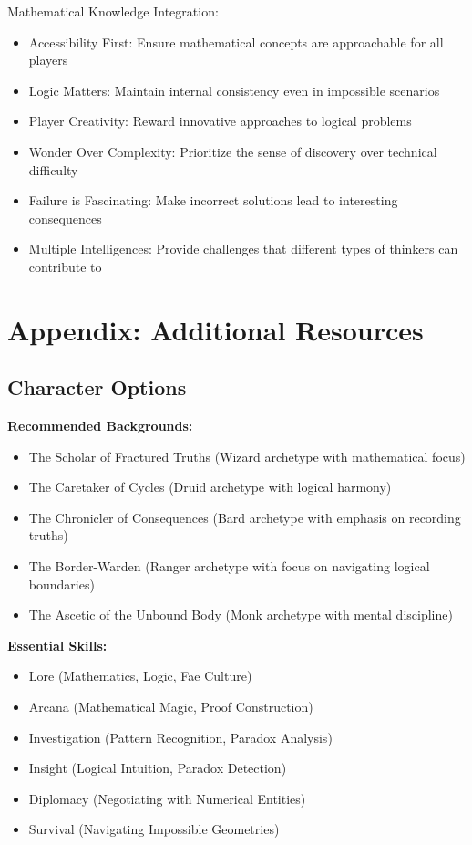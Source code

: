 \documentclass[11pt]{article}
\begin{document}
Mathematical Knowledge Integration:
\begin{itemize}
\item Accessibility First: Ensure mathematical concepts are approachable for all players
\item Logic Matters: Maintain internal consistency even in impossible scenarios
\item Player Creativity: Reward innovative approaches to logical problems
\item Wonder Over Complexity: Prioritize the sense of discovery over technical difficulty
\item Failure is Fascinating: Make incorrect solutions lead to interesting consequences
\item Multiple Intelligences: Provide challenges that different types of thinkers can contribute to
\end{itemize}

\section{Appendix: Additional Resources}

\subsection{Character Options}

\textbf{Recommended Backgrounds:}
\begin{itemize}
\item The Scholar of Fractured Truths (Wizard archetype with mathematical focus)
\item The Caretaker of Cycles (Druid archetype with logical harmony)
\item The Chronicler of Consequences (Bard archetype with emphasis on recording truths)
\item The Border-Warden (Ranger archetype with focus on navigating logical boundaries)
\item The Ascetic of the Unbound Body (Monk archetype with mental discipline)
\end{itemize}

\textbf{Essential Skills:}
\begin{itemize}
\item Lore (Mathematics, Logic, Fae Culture)
\item Arcana (Mathematical Magic, Proof Construction)
\item Investigation (Pattern Recognition, Paradox Analysis)
\item Insight (Logical Intuition, Paradox Detection)
\item Diplomacy (Negotiating with Numerical Entities)
\item Survival (Navigating Impossible Geometries)
\end{itemize}
\end{document}
